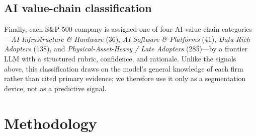 \documentclass[11pt]{article}
\begin{document}
\subsection{AI value-chain classification}

Finally, each S\&P 500 company is assigned one of four AI value-chain
categories---\emph{AI Infrastructure \& Hardware} (36), \emph{AI Software \&
Platforms} (41), \emph{Data-Rich Adopters} (138), and
\emph{Physical-Asset-Heavy / Late Adopters} (285)---by a frontier LLM with a
structured rubric, confidence, and rationale. Unlike the signals above, this
classification draws on the model's general knowledge of each firm rather than
cited primary evidence; we therefore use it only as a segmentation device, not
as a predictive signal.

\section{Methodology}
\label{sec:method}
\end{document}
